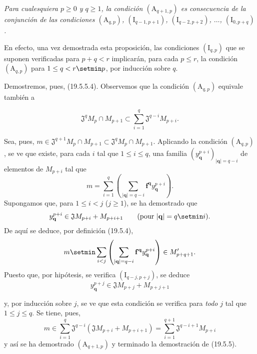 \begin{env}[19.5.5.4]
\label{IV.19.5.5.4}
\emph{Para cualesquiera $p\geq0$ y $q\geq1$, la condición $(\mathrm A_{q+1,p})$ es consecuencia de la conjunción de las condiciones $(\mathrm A_{q,p})$, $(\mathrm I_{q-1,p+1})$, $(\mathrm I_{q-2,p+2})$, $\ldots$, $(\mathrm I_{0,p+q})$.}

En efecto, una vez demostrada esta proposición, las condiciones $(\mathrm I_{q,p})$ que se suponen verificadas para $p+q<r$ implicarán, para cada $p\leq r$, la condición $(\mathrm A_{q,p})$ para $1\leq q<r\setmin p$, por inducción sobre $q$.

Demostremos, pues, (19.5.5.4). Observemos que la condición $(\mathrm A_{q,p})$ equivale también a
\end{env}

\begin{env}[19.5.5.5]
\label{IV.19.5.5.5}
\[
  \mathfrak J^qM_p\cap M_{p+1}\subset\sum_{i=1}^q\mathfrak J^{q-i}M_{p+i}.
\]

Sea, pues, $m\in\mathfrak J^{q+1}M_p\cap M_{p+1}\subset\mathfrak J^qM_p\cap M_{p+1}$. Aplicando la condición $(\mathrm A_{q,p})$, se ve que existe, para cada $i$ tal que $1\leq i\leq q$, una familia $(y_{\mathbf q}^{p+i})_{|\mathbf q|=q-i}$ de elementos de $M_{p+i}$ tal que
\[
  m=\sum_{i=1}^q\left(\sum_{|\mathbf q|=q-i}\mathbf f^{\mathbf q}y_{\mathbf q}^{p+i}\right).
\]
Supongamos que, para $1\leq i<j$ ($j\geq1$), se ha demostrado que
\[
  y_{\mathbf q}^{p+i}\in\mathfrak JM_{p+i}+M_{p+i+1}\qquad(\text{pour }|\mathbf q|=q\setmin i).
\]
De aquí se deduce, por definición (19.5.4),
\[
  m\setmin\sum_{i<j}\left(\sum_{|\mathbf q|=q-i}\mathbf f^{\mathbf q}y_{\mathbf q}^{p+i}\right)\in M_{p+q+1}'.
\]
Puesto que, por hipótesis, se verifica $(\mathrm I_{q-j,p+j})$, se deduce
\[
  y_{\mathbf q}^{p+j}\in\mathfrak JM_{p+j}+M_{p+j+1}
\]


y, por inducción sobre $j$, se ve que esta condición se verifica para \emph{todo} $j$ tal que $1\leq j\leq q$. Se tiene, pues,
\[
  m\in\sum_{i=1}^q\mathfrak J^{q-i}(\mathfrak JM_{p+i}+M_{p+i+1})=\sum_{i=1}^{q+1}\mathfrak J^{q-i+1}M_{p+i}
\]
y así se ha demostrado $(\mathrm A_{q+1,p})$ y terminado la demostración de (19.5.5).
\end{env}

